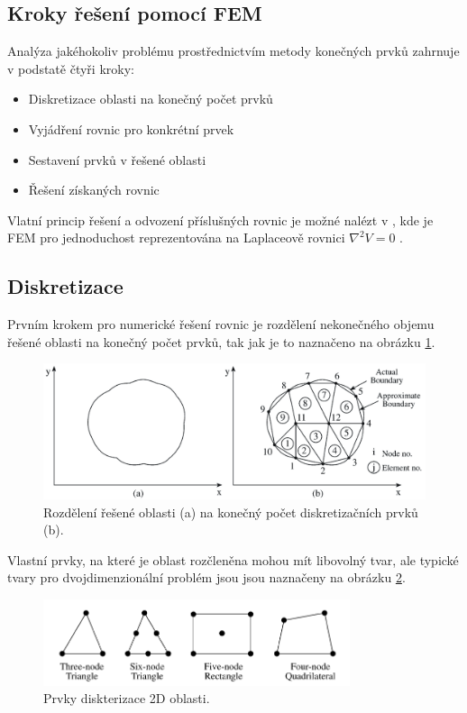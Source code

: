 \subsection{Kroky řešení pomocí FEM}
Analýza jakéhokoliv problému prostřednictvím metody konečných prvků zahrnuje v podstatě čtyři kroky:
\begin{itemize}
\item {Diskretizace oblasti na konečný počet prvků}
\item {Vyjádření rovnic pro konkrétní prvek}
\item {Sestavení prvků v řešené oblasti}
\item {Řešení získaných rovnic}
\end{itemize}
Vlatní princip řešení a odvození příslušných rovnic je možné nalézt v  \cite[kap. 6.2]{num}, kde je FEM pro jednoduchost reprezentována na Laplaceově rovnici $\nabla^{2}V = 0$ .

\subsection*{Diskretizace}
Prvním krokem pro numerické řešení rovnic je rozdělení nekonečného objemu řešené oblasti na konečný počet prvků, tak jak je to naznačeno na obrázku \ref{obr:sim_diskretizace}.
\begin{figure}[!h]
	\centering
	\includegraphics[width=13cm]{sim_diskretizace.png}
	\caption{Rozdělení řešené oblasti (a) na konečný počet diskretizačních prvků (b).\cite{num}}
	\label{obr:sim_diskretizace}
\end{figure}
Vlastní prvky, na které je oblast rozčleněna mohou mít libovolný tvar, ale typické tvary pro dvojdimenzionální problém jsou jsou naznačeny na obrázku \ref{obr:sim_prvky}.
\begin{figure}[!h]
	\centering
	\includegraphics[width=9cm]{sim_prvky.png}
	\caption{Prvky diskterizace 2D oblasti.\cite{num}}
	\label{obr:sim_prvky}
\end{figure}

